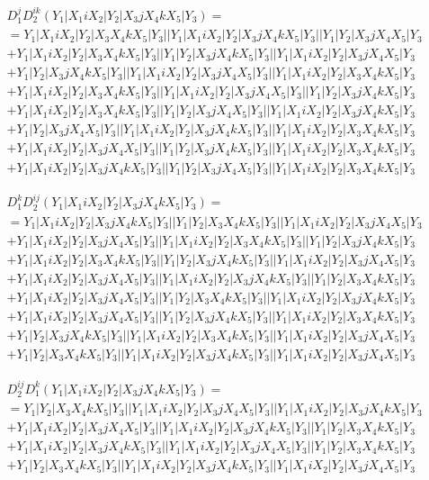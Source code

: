 \documentclass{article}[12pt]
\begin{document}
\begin{align*}
&D_1^jD_2^{ik}(Y_1|X_1iX_2|Y_2|X_3jX_4kX_5|Y_3)=\\
& =Y_1|X_1iX_2|Y_2|X_3X_4kX_5|Y_3||Y_1|X_1iX_2|Y_2|X_3jX_4kX_5|Y_3||Y_1|Y_2|X_3jX_4X_5|Y_3\\ 
 & +Y_1|X_1iX_2|Y_2|X_3X_4kX_5|Y_3||Y_1|Y_2|X_3jX_4kX_5|Y_3||Y_1|X_1iX_2|Y_2|X_3jX_4X_5|Y_3\\ 
 & +Y_1|Y_2|X_3jX_4kX_5|Y_3||Y_1|X_1iX_2|Y_2|X_3jX_4X_5|Y_3||Y_1|X_1iX_2|Y_2|X_3X_4kX_5|Y_3\\ 
 & +Y_1|X_1iX_2|Y_2|X_3X_4kX_5|Y_3||Y_1|X_1iX_2|Y_2|X_3jX_4X_5|Y_3||Y_1|Y_2|X_3jX_4kX_5|Y_3\\ 
 & +Y_1|X_1iX_2|Y_2|X_3X_4kX_5|Y_3||Y_1|Y_2|X_3jX_4X_5|Y_3||Y_1|X_1iX_2|Y_2|X_3jX_4kX_5|Y_3\\ 
 & +Y_1|Y_2|X_3jX_4X_5|Y_3||Y_1|X_1iX_2|Y_2|X_3jX_4kX_5|Y_3||Y_1|X_1iX_2|Y_2|X_3X_4kX_5|Y_3\\ 
 & +Y_1|X_1iX_2|Y_2|X_3jX_4X_5|Y_3||Y_1|Y_2|X_3jX_4kX_5|Y_3||Y_1|X_1iX_2|Y_2|X_3X_4kX_5|Y_3\\ 
 & +Y_1|X_1iX_2|Y_2|X_3jX_4kX_5|Y_3||Y_1|Y_2|X_3jX_4X_5|Y_3||Y_1|X_1iX_2|Y_2|X_3X_4kX_5|Y_3\end{align*}

\begin{align*}
& D_1^kD_2^{ij}(Y_1|X_1iX_2|Y_2|X_3jX_4kX_5|Y_3)=\\
& =Y_1|X_1iX_2|Y_2|X_3jX_4kX_5|Y_3||Y_1|Y_2|X_3X_4kX_5|Y_3||Y_1|X_1iX_2|Y_2|X_3jX_4X_5|Y_3\\ 
 & +Y_1|X_1iX_2|Y_2|X_3jX_4X_5|Y_3||Y_1|X_1iX_2|Y_2|X_3X_4kX_5|Y_3||Y_1|Y_2|X_3jX_4kX_5|Y_3\\ 
 & +Y_1|X_1iX_2|Y_2|X_3X_4kX_5|Y_3||Y_1|Y_2|X_3jX_4kX_5|Y_3||Y_1|X_1iX_2|Y_2|X_3jX_4X_5|Y_3\\ 
 & +Y_1|X_1iX_2|Y_2|X_3jX_4X_5|Y_3||Y_1|X_1iX_2|Y_2|X_3jX_4kX_5|Y_3||Y_1|Y_2|X_3X_4kX_5|Y_3\\ 
 & +Y_1|X_1iX_2|Y_2|X_3jX_4X_5|Y_3||Y_1|Y_2|X_3X_4kX_5|Y_3||Y_1|X_1iX_2|Y_2|X_3jX_4kX_5|Y_3\\ 
 & +Y_1|X_1iX_2|Y_2|X_3jX_4X_5|Y_3||Y_1|Y_2|X_3jX_4kX_5|Y_3||Y_1|X_1iX_2|Y_2|X_3X_4kX_5|Y_3\\ 
 & +Y_1|Y_2|X_3jX_4kX_5|Y_3||Y_1|X_1iX_2|Y_2|X_3X_4kX_5|Y_3||Y_1|X_1iX_2|Y_2|X_3jX_4X_5|Y_3\\ 
 & +Y_1|Y_2|X_3X_4kX_5|Y_3||Y_1|X_1iX_2|Y_2|X_3jX_4kX_5|Y_3||Y_1|X_1iX_2|Y_2|X_3jX_4X_5|Y_3\end{align*}

\begin{align*}
& D_2^{ij}D_1^k(Y_1|X_1iX_2|Y_2|X_3jX_4kX_5|Y_3) =\\
& =Y_1|Y_2|X_3X_4kX_5|Y_3||Y_1|X_1iX_2|Y_2|X_3jX_4X_5|Y_3||Y_1|X_1iX_2|Y_2|X_3jX_4kX_5|Y_3\\ 
 & +Y_1|X_1iX_2|Y_2|X_3jX_4X_5|Y_3||Y_1|X_1iX_2|Y_2|X_3jX_4kX_5|Y_3||Y_1|Y_2|X_3X_4kX_5|Y_3\\ 
 & +Y_1|X_1iX_2|Y_2|X_3jX_4kX_5|Y_3||Y_1|X_1iX_2|Y_2|X_3jX_4X_5|Y_3||Y_1|Y_2|X_3X_4kX_5|Y_3\\ 
 & +Y_1|Y_2|X_3X_4kX_5|Y_3||Y_1|X_1iX_2|Y_2|X_3jX_4kX_5|Y_3||Y_1|X_1iX_2|Y_2|X_3jX_4X_5|Y_3\end{align*}
\end{document}
